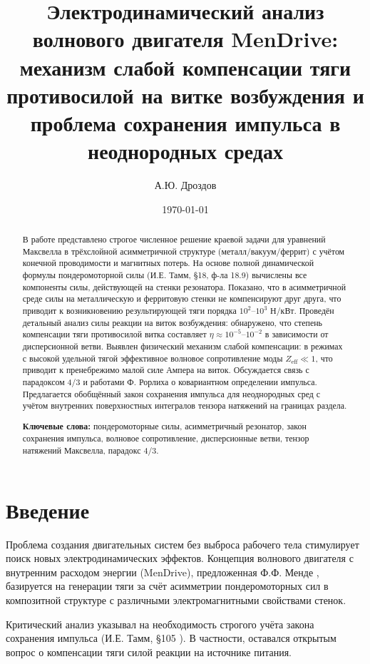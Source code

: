 \documentclass[a4paper,12pt]{article}
\title{\textbf{Электродинамический анализ волнового двигателя MenDrive:
механизм слабой компенсации тяги противосилой на витке возбуждения
и проблема сохранения импульса в неоднородных средах}}
\author{А.Ю. Дроздов}
\date{\today}
\begin{document}
\maketitle

\begin{abstract}
В работе представлено строгое численное решение краевой задачи для уравнений
Максвелла в трёхслойной асимметричной структуре (металл/вакуум/феррит) с учётом
конечной проводимости и магнитных потерь. На основе полной динамической формулы
пондеромоторной силы (И.Е. Тамм, \S 18, ф-ла 18.9) вычислены все компоненты силы,
действующей на стенки резонатора. Показано, что в асимметричной среде силы на
металлическую и ферритовую стенки не компенсируют друг друга, что приводит к
возникновению результирующей тяги порядка $10^2$--$10^3$ Н/кВт. Проведён детальный
анализ силы реакции на виток возбуждения: обнаружено, что степень компенсации
тяги противосилой витка составляет $\eta \approx 10^{-5}$--$10^{-2}$ в зависимости
от дисперсионной ветви. Выявлен физический механизм слабой компенсации: в режимах
с высокой удельной тягой эффективное волновое сопротивление моды $Z_{\text{eff}} \ll 1$,
что приводит к пренебрежимо малой силе Ампера на виток. Обсуждается связь с
парадоксом 4/3 и работами Ф. Рорлиха о ковариантном определении импульса.
Предлагается обобщённый закон сохранения импульса для неоднородных сред с учётом
внутренних поверхностных интегралов тензора натяжений на границах раздела.

\textbf{Ключевые слова:} пондеромоторные силы, асимметричный резонатор, закон
сохранения импульса, волновое сопротивление, дисперсионные ветви, тензор
натяжений Максвелла, парадокс 4/3.
\end{abstract}

\section{Введение}

Проблема создания двигательных систем без выброса рабочего тела стимулирует
поиск новых электродинамических эффектов. Концепция волнового двигателя с
внутренним расходом энергии (MenDrive), предложенная Ф.Ф. Менде \cite{Mende},
базируется на генерации тяги за счёт асимметрии пондеромоторных сил в
композитной структуре с различными электромагнитными свойствами стенок.

Критический анализ \cite{Karavashkin, Drozdov} указывал на необходимость
строгого учёта закона сохранения импульса (И.Е. Тамм, \S 105 \cite{Tamm}).
В частности, оставался открытым вопрос о компенсации тяги силой реакции
на источнике питания.
\end{document}
